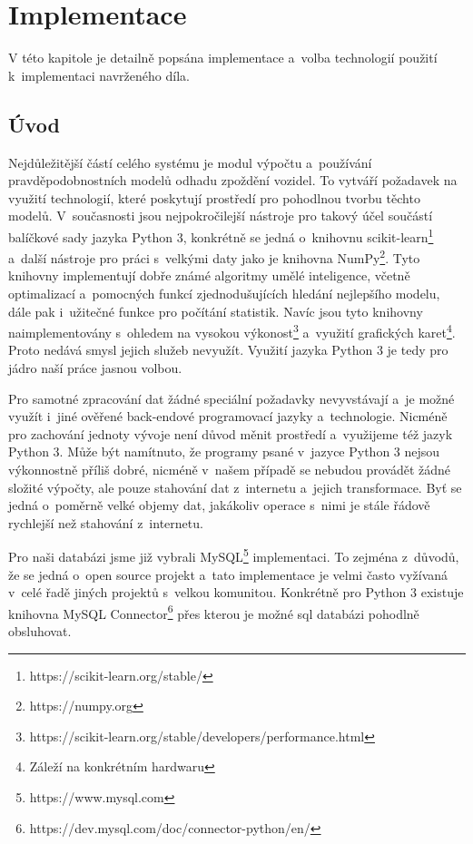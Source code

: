 

\chapter{Implementace} \label{chapter:implementace}


V této kapitole je detailně popsána implementace a~volba technologií použití k~implementaci navrženého díla.


\section{Úvod}


Nejdůležitější částí celého systému je modul výpočtu a~používání pravděpodobnostních modelů odhadu zpoždění vozidel. To vytváří požadavek na využití technologií, které poskytují prostředí pro pohodlnou tvorbu těchto modelů. V~současnosti jsou nejpokročilejší nástroje pro takový účel součástí balíčkové sady jazyka Python 3, konkrétně se jedná o~knihovnu scikit-learn\footnote{https://scikit-learn.org/stable/} a~další nástroje pro práci s~velkými daty jako je knihovna NumPy\footnote{https://numpy.org}. Tyto knihovny implementují dobře známé algoritmy umělé inteligence, včetně optimalizací a~pomocných funkcí zjednodušujících hledání nejlepšího modelu, dále pak i~užitečné funkce pro počítání statistik. Navíc jsou tyto knihovny naimplementovány s~ohledem na vysokou výkonost\footnote{https://scikit-learn.org/stable/developers/performance.html} a~využití grafických karet\footnote{Záleží na konkrétním hardwaru}. Proto nedává smysl jejich služeb nevyužít. Využití jazyka Python 3 je tedy pro jádro naší práce jasnou volbou.


\bigbreak


Pro samotné zpracování dat žádné speciální požadavky nevyvstávají a~je možné využít i~jiné ověřené back-endové programovací jazyky a~technologie. Nicméně pro zachování jednoty vývoje není důvod měnit prostředí a~využijeme též jazyk Python 3. Může být namítnuto, že programy psané v~jazyce Python 3 nejsou výkonnostně příliš dobré, nicméně v~našem případě se nebudou provádět žádné složité výpočty, ale pouze stahování dat z~internetu a~jejich transformace. Byť se jedná o~poměrně velké objemy dat, jakákoliv operace s~nimi je stále řádově rychlejší než stahování z~internetu.


\bigbreak


Pro naši databázi jsme již vybrali MySQL\footnote{https://www.mysql.com} implementaci. To zejména z~důvodů, že se jedná o~open source projekt a~tato implementace je velmi často vyžívaná v~celé řadě jiných projektů s~velkou komunitou. Konkrétně pro Python 3 existuje knihovna MySQL Connector\footnote{https://dev.mysql.com/doc/connector-python/en/} přes kterou je možné \gls{sql} databázi pohodlně obsluhovat.


